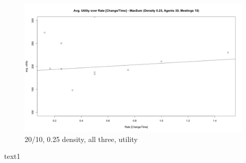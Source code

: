 \begin{figure}[H]
\centering
\includegraphics[width=430px]{graphics/experiments/dynamic/d_1.png}
\caption{20/10, 0.25 density, all three, utility}
\label{fig:mgm_graph}
\end{figure}

text1

%

